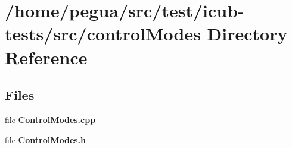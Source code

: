 \section{/home/pegua/src/test/icub-\/tests/src/control\-Modes Directory Reference}
\label{dir_67a6d6fd93427d49c4a56e9e89568513}
\subsection*{Files}
\begin{DoxyCompactItemize}
\item 
file {\bfseries Control\-Modes.\-cpp}
\item 
file {\bfseries Control\-Modes.\-h}
\end{DoxyCompactItemize}
